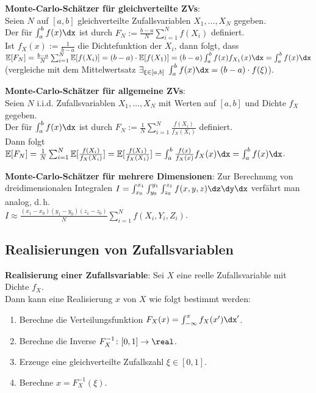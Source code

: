 \linie

\textbf{Monte-Carlo-Schätzer für gleichverteilte ZVs}:\\
Seien $N$ auf $[a, b]$ gleichverteilte Zufallsvariablen $X_1, \dotsc, X_N$ gegeben.\\
Der  für $\int_a^b f(x) \dx$ ist durch
$F_N := \frac{b - a}{N} \sum_{i=1}^N f(X_i)$ definiert.\\
Ist $f_X(x) := \frac{1}{b-a}$ die Dichtefunktion der $X_i$, dann folgt, dass\\
$\EE[F_N] = \frac{b - a}{N} \sum_{i=1}^N \EE[f(X_i)]
= (b-a) \cdot \EE[f(X_1)] = (b-a) \int_a^b f(x)f_{X_1}(x) \dx = \int_a^b f(x) \dx$\\
(vergleiche mit dem Mittelwertsatz
$\exists_{\xi \in [a, b]}\; \int_a^b f(x) \dx = (b-a) \cdot f(\xi)$).

\textbf{Monte-Carlo-Schätzer für allgemeine ZVs}:\\
Seien $N$ i.i.d. Zufallsvariablen $X_1, \dotsc, X_N$ mit Werten auf $[a, b]$ und
Dichte $f_X$ gegeben.\\
Der  für $\int_a^b f(x) \dx$ ist durch
$F_N := \frac{1}{N} \sum_{i=1}^N \frac{f(X_i)}{f_X(X_i)}$ definiert.\\
Dann folgt
$\EE[F_N] = \frac{1}{N} \sum_{i=1}^N \EE[\frac{f(X_i)}{f_X(X_i)}]
= \EE[\frac{f(X_1)}{f_X(X_1)}] = \int_a^b \frac{f(x)}{f_X(x)} f_X(x) \dx = \int_a^b f(x) \dx$.

\linie

\textbf{Monte-Carlo-Schätzer für mehrere Dimensionen}:
Zur Berechnung von dreidimensionalen Integralen
$I = \int_{x_0}^{x_1} \int_{y_0}^{y_1} \int_{z_0}^{z_1} f(x, y, z) \dz\dy\dx$
verfährt man analog, d.\,h.\\
$I \approx \frac{(x_1 - x_0) (y_1 - y_0) (z_1 - z_0)}{N} \sum_{i=1}^N f(X_i, Y_i, Z_i)$.

\pagebreak

\subsection{%
    Realisierungen von Zufallsvariablen%
}

\textbf{Realisierung einer Zufallsvariable}:
Sei $X$ eine reelle Zufallsvariable mit Dichte $f_X$.\\
Dann kann eine Realisierung $x$ von $X$ wie folgt bestimmt werden:
\begin{enumerate}
    \item
    Berechne die Verteilungsfunktion $F_X(x) = \int_{-\infty}^x f_X(x') \dx'$.

    \item
    Berechne die Inverse $F_X^{-1}\colon [0, 1] \to \real$.

    \item
    Erzeuge eine gleichverteilte Zufallszahl $\xi \in [0, 1]$.

    \item
    Berechne $x = F_X^{-1}(\xi)$.
\end{enumerate}

